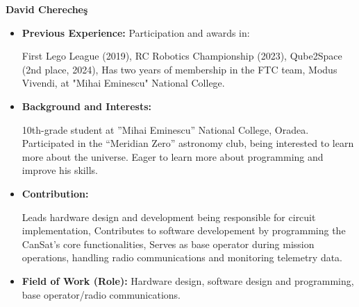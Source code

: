 \item[] \textbf{David Chereche\c{s}}
    \begin{itemize}[label=]
        \item[\faCogs] \textbf{Previous Experience:} Participation and awards in: 
            \begin{itemize}[label=]
                \myitemtwo First Lego League (2019),
                \myitemtwo RC Robotics Championship (2023),
                \myitemtwo Qube2Space (2nd place, 2024),
                \myitemtwo Has two years of membership in the FTC team, Modus Vivendi, at "Mihai Eminescu" National College.
            \end{itemize}
        \item[\faGraduationCap] \textbf{Background and Interests:} 
        \begin{itemize}[label=\textbullet]
            \myitemtwo 10th-grade student at ”Mihai Eminescu” National College, Oradea.
            \myitemtwo Participated in the “Meridian Zero” astronomy club, being interested to learn more about the universe.
            \myitemtwo Eager to learn more about programming and improve his skills.
        \end{itemize}
        \item[\faEdit] \textbf{Contribution:}
            \begin{itemize}[label=\textbullet]
                \myitemtwo Leads hardware design and development being responsible for circuit implementation,
                \myitemtwo Contributes to software developement by programming the CanSat's core functionalities,
                \myitemtwo Serves as base operator during mission operations, handling radio communications and monitoring telemetry data.
            \end{itemize}
        \item[\faMicroscope] \textbf{Field of Work (Role):} Hardware design, software design and programming, base operator/radio communications.
    \end{itemize}
    \vspace{0.2 cm}
    